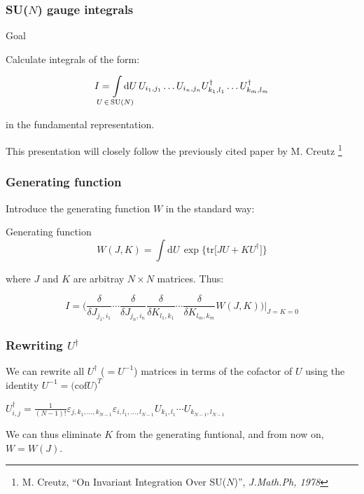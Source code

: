 \documentclass[10pt,a4paper,usenames,dvipsnames]{beamer}
\newcommand{\tr}{\mathrm{tr}}
\begin{document}
\begin{frame}
  \frametitle{SU($N$) gauge integrals}

  \begin{alertblock}{Goal}

    Calculate integrals of the form:
    
    \[
      I = \int\limits_{\mathclap{U \, \in \, \mathrm{SU}(N)}} \mathrm{d} U \, U_{i_1,j_1} \dots U_{i_n,j_n} U_{k_1,l_1}^{\dagger}
      \dots U_{k_m,l_m}^{\dagger}
    \]

    in the fundamental representation.
  \end{alertblock}

  \vspace{1em}

  This presentation will closely follow the previously cited paper by M. Creutz%
  \footnote{M. Creutz, ``On Invariant Integration Over SU($N$)'', \emph{J.Math.Ph, 1978}}

\end{frame}

\begin{frame}
  \frametitle{Generating function}

  Introduce the generating function $W$ in the standard way:
  \begin{block}{Generating function}
    \[
      W(J,K) = \int \mathrm{d} U \, \exp \Big\{ \tr \big[ J U + K U^{\dagger} \big] \Big\}
    \]
  \end{block}
  where $J$ and $K$ are arbitray $N \times N$ matrices. Thus:
  \begin{block}{}
    \[
      I = \bigg( \frac{\delta}{\delta J_{j_1,i_1}} \cdots \frac{\delta}{\delta J_{j_n,i_n}} \frac{\delta}{\delta K_{l_1,k_1}}
      \cdots \frac{\delta}{\delta K_{l_m,k_m}} W(J,K) \bigg) \bigg|_{J=K=0}
    \]
  \end{block}

\end{frame}

\begin{frame}
  \frametitle{Rewriting $U^{\dagger}$}

  We can rewrite all $U^{\dagger}$ ($ = U^{-1}$) matrices in terms of the cofactor of $U$ using the identity $U^{-1} = \big(
  \mathrm{cof} U \big)^T$

  \vfill

  \begin{block}{}
    \centering
    $U_{i,j}^{\dagger} = \displaystyle\frac{1}{(N-1)!} \varepsilon_{j,k_1,\dots,k_{N-1}} \varepsilon_{i,l_1,\dots,l_{N-1}} U_{k_1,l_1} \cdots
    U_{k_{N-1},l_{N-1}}$
  \end{block}

  \vfill

  We can thus eliminate $K$ from the generating funtional, and from now on, $W = W(J)$.

\end{frame}
\end{document}
